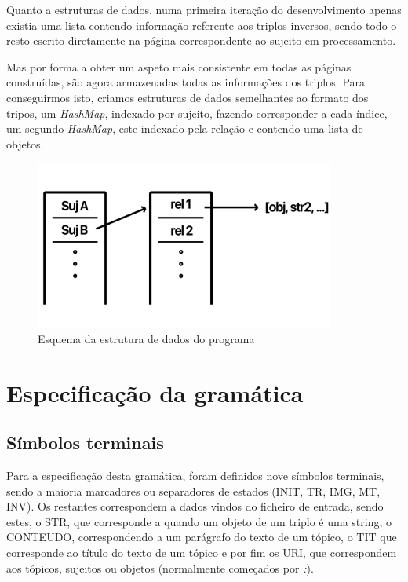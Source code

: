 \documentclass[a4paper]{report}
\begin{document}
Quanto a estruturas de dados, numa primeira iteração do desenvolvimento apenas
existia uma lista contendo informação referente aos triplos inversos, sendo todo
o resto escrito diretamente na página correspondente ao sujeito em
processamento. 

Mas por forma a obter um aspeto mais consistente em todas as páginas
construídas, são agora armazenadas todas as informações dos triplos.
Para conseguirmos isto, criamos estruturas de dados semelhantes ao formato dos
tripos, um \textit{HashMap}, indexado por sujeito, fazendo corresponder a cada
índice, um segundo \textit{HashMap}, este indexado pela relação e contendo uma
lista de objetos.

\begin{figure}[H]
    \centering
    \includegraphics[width=0.88\textwidth]{data_struct.png}
    \caption{Esquema da estrutura de dados do programa}
\end{figure}

\section{Especificação da gramática}

\subsection{Símbolos terminais}

Para a especificação desta gramática, foram definidos nove símbolos terminais,
sendo a maioria marcadores ou separadores de estados (INIT, TR, IMG, MT, INV).
Os restantes correspondem a dados vindos do ficheiro de entrada, sendo estes, o
STR, que corresponde a quando um objeto de um triplo é uma string, o CONTEUDO,
correspondendo a um parágrafo do texto de um tópico, o TIT que corresponde ao
título do texto de um tópico e por fim os URI, que correspondem aos tópicos,
sujeitos ou objetos (normalmente começados por \textit{:}).
\end{document}
